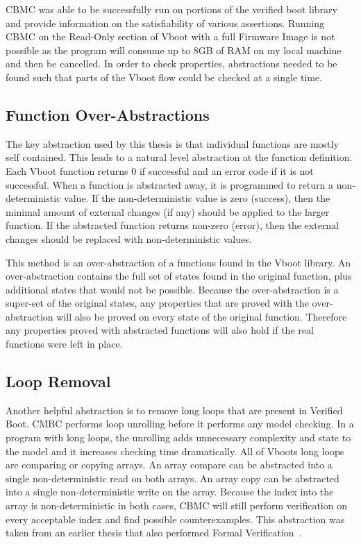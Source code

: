 CBMC was able to be successfully run on portions of the verified boot library and provide information on the satisfiability of various assertions.
Running CBMC on the Read-Only section of Vboot with a full Firmware Image is not possible as the program will consume up to 8GB of RAM on my local machine and then be cancelled.
In order to check properties, abstractions needed to be found such that parts of the Vboot flow could be checked at a single time.

\subsection{Function Over-Abstractions}

The key abstraction used by this thesis is that individual functions are mostly
self contained.
This leads to a natural level abstraction at the function definition.
Each Vboot function returns 0 if successful and an error code if it is not successful.
When a function is abstracted away, it is programmed to return a
non-deterministic value.
If the non-deterministic value is zero (success), then the minimal amount of external changes (if any) should be applied to the larger function.
If the abstracted function returns non-zero (error), then the external changes should be replaced with non-deterministic values.

This method is an over-abstraction of a functions found in the Vboot library.
An over-abstraction contains the full set of states found in the original function, plus additional states that would not be possible.
Because the over-abstraction is a super-set of the original states, any properties that are proved with the over-abstraction will also be proved on every state of the original function.
Therefore any properties proved with abstracted functions will also hold if the real functions were left in place.

\subsection{Loop Removal}

Another helpful abstraction is to remove long loops that are present in Verified
Boot.
CMBC performs loop unrolling before it performs any model checking. 
In a program with long loops, the unrolling adds unnecessary complexity and
state to the model and it increases checking time dramatically.
All of Vboots long loops are comparing or copying arrays.
An array compare can be abstracted into a single non-deterministic read on both
arrays.
An array copy can be abstracted into a single non-deterministic write on the
array.
Because the index into the array is non-deterministic in both cases, CBMC will
still perform verification on every acceptable index and find possible
counterexamples.
This abstraction was taken from an earlier thesis that also performed Formal
Verification~\cite{elane}. 

